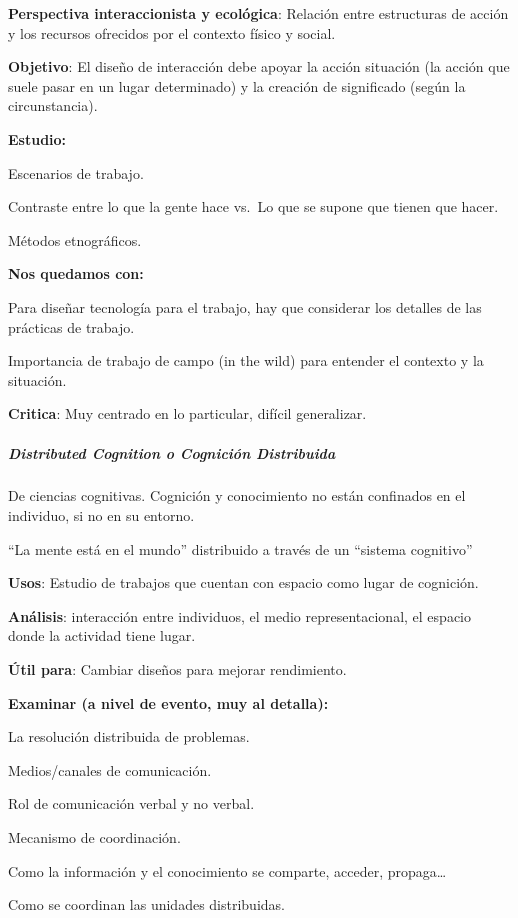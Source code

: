 \documentclass[12pt]{report} %
\begin{document}
\textbf{Perspectiva interaccionista y ecológica}: Relación entre
estructuras de acción y los recursos ofrecidos por el contexto físico y
social.

\textbf{Objetivo}: El diseño de interacción debe apoyar la acción
situación (la acción que suele pasar en un lugar determinado) y la
creación de significado (según la circunstancia).

\textbf{Estudio:}

Escenarios de trabajo.

Contraste entre lo que la gente hace vs.~Lo que se supone que tienen que
hacer.

Métodos etnográficos.

\textbf{Nos quedamos con:}

Para diseñar tecnología para el trabajo, hay que considerar los detalles
de las prácticas de trabajo.

Importancia de trabajo de campo (in the wild) para entender el contexto
y la situación.

\textbf{Critica}: Muy centrado en lo particular, difícil generalizar.

\hypertarget{distributed-cognition-o-cogniciuxf3n-distribuida}{%
\subparagraph{Distributed Cognition o Cognición
Distribuida}\label{distributed-cognition-o-cogniciuxf3n-distribuida}}

De ciencias cognitivas. Cognición y conocimiento no están confinados en
el individuo, si no en su entorno.

``La mente está en el mundo'' distribuido a través de un ``sistema
cognitivo''

\textbf{Usos}: Estudio de trabajos que cuentan con espacio como lugar de
cognición.

\textbf{Análisis}: interacción entre individuos, el medio
representacional, el espacio donde la actividad tiene lugar.

\textbf{Útil para}: Cambiar diseños para mejorar rendimiento.

\textbf{Examinar (a nivel de evento, muy al detalla):}

La resolución distribuida de problemas.

Medios/canales de comunicación.

Rol de comunicación verbal y no verbal.

Mecanismo de coordinación.

Como la información y el conocimiento se comparte, acceder,
propaga\ldots{}

Como se coordinan las unidades distribuidas.
\end{document}
